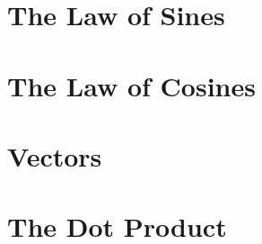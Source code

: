 \section{The Law of Sines}



\newpage

\section{The Law of Cosines}



\newpage

\section{Vectors}



\newpage

\section{The Dot Product}



\newpage